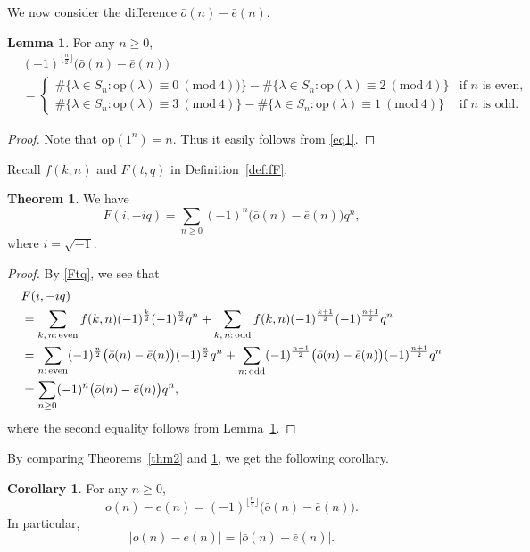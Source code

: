 \documentclass[reqno]{amsart}
\theoremstyle{definition}
\newtheorem{thm}{Theorem}%
\newtheorem{cor}{Corollary}%
\newtheorem{lem}{Lemma}%
\newcommand{\op}{\mathrm{op}}
\newcommand{\lam}{\lambda}
\newcommand{\be}{\bar{e}}
\newcommand{\bo}{\bar{o}}
\newcommand{\Mod}[1]{\ (\mathrm{mod}\ #1)}
\begin{document}
We now consider the difference $\bo(n)-\be(n)$.

\begin{lem}  \label{lem2}
For any $n \ge 0$,
\begin{align*}
&(-1)^{\lfloor \frac{n}{2} \rfloor} \big(\bo(n)-\be(n) \big)  \\
&=\begin{cases}
\#\{\lam\in S_n : \op(\lam) \equiv 0 \Mod{4})\} -\#\{\lam\in S_n : \op(\lam) \equiv 2 \Mod{4}\} & \mbox{if $n$ is even,}\\ 
\#\{\lam\in S_n : \op(\lam) \equiv 3 \Mod{4}\} -\#\{\lam\in S_n : \op(\lam) \equiv 1 \Mod{4}\} & \mbox{if $n$ is odd.}
\end{cases}
\end{align*}
\end{lem}
\begin{proof}
Note that $\op(1^n)=n$. Thus it easily follows from \eqref{eq1}.
\end{proof}

Recall $f(k,n)$ and $F(t,q)$ in Definition~\ref{def:fF}.

\begin{thm} \label{thm5}
We have
$$
F(i,-iq)
= \sum_{n\ge 0} (-1)^n \big(\bo(n) -\be(n) \big)q^n ,
$$
where $i=\sqrt{-1}$.
\end{thm}
\begin{proof}
By \eqref{Ftq},  we see that
\begin{align*}
&F(i,-iq) \\
&=\sum_{\text{$k,n$:\,even}}f(k,n)(-1)^{\frac{k}{2}} (-1)^{\frac{n}{2}}q^n + \sum_{\text{$k,n$:\,odd}}f(k,n)(-1)^{\frac{k+1}{2}} (-1)^{\frac{n+1}{2}}q^n\\
&=\sum_{\text{$n$:\,even}}(-1)^{\frac{n}{2}} \big(\bo(n) -\be(n) \big) (-1)^{\frac{n}{2}} q^n + \sum_{\text{$n$:\,odd}}(-1)^{\frac{n-1}{2}} \big(\bo(n) -\be(n) \big)(-1)^{\frac{n+1}{2}} q^n \\
&=\sum_{n \ge 0}(-1)^n \big(\bo(n) -\be(n) \big) q^n,
\end{align*}
where the second equality follows from Lemma~\ref{lem2}. 
\end{proof}

By comparing Theorems~\ref{thm2} and \ref{thm5}, we get the following corollary. 

\begin{cor}
For any $n \ge 0$,
$$
o(n) -e(n) = (-1)^{\lfloor \frac{n}{2} \rfloor} \big(\bo(n) -\be(n) \big).
$$
In particular, 
$$
|o(n) -e(n)| = |\bo(n) -\be(n)|.
$$
\end{cor}
\end{document}
